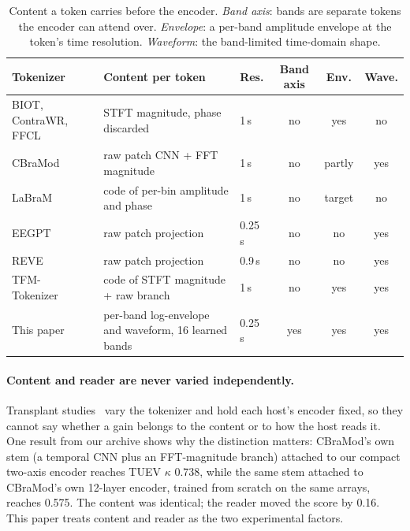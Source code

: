 \begin{table}[t]
\centering
\TableStyle
\caption{Content a token carries before the encoder. \emph{Band axis}: bands are separate tokens the encoder can attend over. \emph{Envelope}: a per-band amplitude envelope at the token's time resolution. \emph{Waveform}: the band-limited time-domain shape.}
\label{tab:tokenizers}
\begin{tabular}{@{}lllccc@{}}
\toprule
Tokenizer & Content per token & Res. & Band axis & Env. & Wave. \\
\midrule
BIOT, ContraWR, FFCL~\cite{yang2023biot} & STFT magnitude, phase discarded & 1\,s & no & yes & no \\
CBraMod~\cite{wang2025cbramod} & raw patch CNN + FFT magnitude & 1\,s & no & partly & yes \\
LaBraM~\cite{jiang2024labram} & code of per-bin amplitude and phase & 1\,s & no & target & no \\
EEGPT~\cite{wang2024eegpt} & raw patch projection & 0.25\,s & no & no & yes \\
REVE~\cite{elouahidi2025reve} & raw patch projection & 0.9\,s & no & no & yes \\
TFM-Tokenizer~\cite{pradeepkumar2026tfm} & code of STFT magnitude + raw branch & 1\,s & no & yes & yes \\
\midrule
This paper & per-band log-envelope and waveform, 16 learned bands & 0.25\,s & yes & yes & yes \\
\bottomrule
\end{tabular}
\end{table}

\paragraph{Content and reader are never varied independently.}
Transplant studies~\cite{pradeepkumar2026tfm} vary the tokenizer and hold each host's encoder fixed, so they cannot say whether a gain belongs to the content or to how the host reads it. One result from our archive shows why the distinction matters: CBraMod's own stem (a temporal CNN plus an FFT-magnitude branch) attached to our compact two-axis encoder reaches TUEV $\kappa$ 0.738, while the same stem attached to CBraMod's own 12-layer encoder, trained from scratch on the same arrays, reaches 0.575. The content was identical; the reader moved the score by 0.16. This paper treats content and reader as the two experimental factors.
